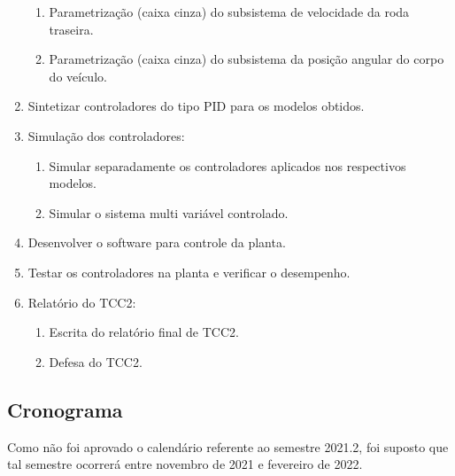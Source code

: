 \documentclass[conference,harvard,brazil,english]{sbatex}
\begin{document}
\begin{enumerate}[1.]
\begin{enumerate}[1)]
                    \item Parametrização (caixa cinza) do subsistema de velocidade da roda traseira.
                    \item Parametrização (caixa cinza) do subsistema da posição angular do corpo do veículo.
                \end{enumerate}
            \item Sintetizar controladores do tipo PID para os modelos obtidos.
            \item Simulação dos controladores:
                \begin{enumerate}[1)]
                    \item Simular separadamente os controladores aplicados nos respectivos modelos.
                    \item Simular o sistema multi variável controlado.
                \end{enumerate}
            \item Desenvolver o software para controle da planta.
            \item Testar os controladores na planta e verificar o desempenho.
            \item Relatório do TCC2:
                \begin{enumerate}[1)]
                    \item Escrita do relatório final de TCC2.
                    \item Defesa do TCC2.
                \end{enumerate}
        \end{enumerate}
        
        \subsection{Cronograma}
            
            Como não foi aprovado o calendário referente ao semestre 2021.2, foi suposto que tal semestre ocorrerá entre novembro de 2021 e fevereiro de 2022.
        
\end{document}
